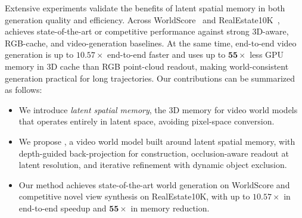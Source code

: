 Extensive experiments validate the benefits of latent spatial memory in both generation quality and efficiency. Across WorldScore~\cite{worldscore,duan2025worldscore} and RealEstate10K~\cite{zhou2018stereo}, \method{} achieves state-of-the-art or competitive performance against strong 3D-aware, RGB-cache, and video-generation baselines. At the same time, end-to-end video generation is up to $\mathbf{10.57\times}$ end-to-end faster and uses up to $\mathbf{55\times}$ less GPU memory in 3D cache than RGB point-cloud readout, making world-consistent generation practical for long trajectories.
Our contributions can be summarized as follows:
\begin{itemize}[leftmargin=*]
    \item We introduce \emph{latent spatial memory}, the 3D memory for video world models that operates entirely in latent space, avoiding pixel-space conversion.
    \item We propose \method{}, a video world model built around latent spatial memory, with depth-guided back-projection for construction, occlusion-aware readout at latent resolution, and iterative refinement with dynamic object exclusion.
    \item Our method achieves state-of-the-art world generation on WorldScore and competitive novel view synthesis on RealEstate10K, with up to $\mathbf{10.57\times}$ in end-to-end speedup and $\mathbf{55\times}$ in memory reduction.
\end{itemize}
